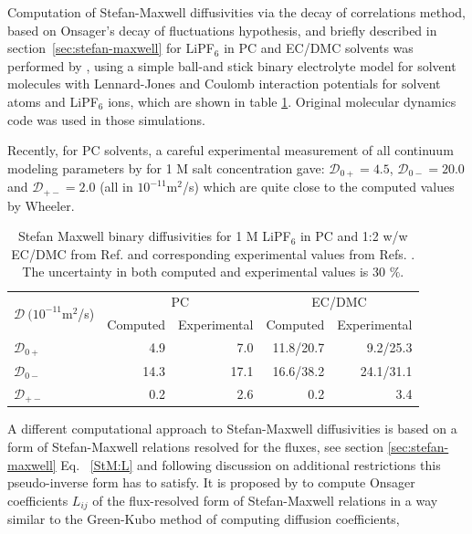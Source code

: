 \documentclass[../main.tex]{subfiles}
\begin{document}
Computation of Stefan-Maxwell diffusivities via the decay of correlations method, based on Onsager's decay of fluctuations hypothesis, and briefly described in section~\ref{sec:stefan-maxwell} for LiPF$_6$ in PC and EC/DMC solvents was performed by \citeauthor{2002PhDWheeler}, using a simple ball-and stick binary electrolyte model for solvent molecules with Lennard-Jones and Coulomb interaction potentials for solvent atoms and LiPF$_6$ ions, \cite{2002PhDWheeler} which are shown in table \ref{tab:wheeler}. Original molecular dynamics code was used in those simulations.

Recently, for PC solvents, a careful experimental measurement of all continuum modeling parameters by \citeauthor{Hou2020} for 1 M salt concentration gave:\cite{Hou2020}
 $ \mathcal{D}_{0+}=  4.5$, $  \mathcal{D}_{0-}= 20.0 $  and $   \mathcal{D}_{+-}=  2.0$ (all in $    10^{-11}$m$^2$/s)
which are quite close to the computed values by Wheeler.\cite{2002PhDWheeler}
\begin{table}[htbp]
    \caption{Stefan Maxwell binary diffusivities for 1 M LiPF$_6$ in PC and 1:2 w/w EC/DMC from Ref.  and corresponding experimental values from Refs. . The uncertainty in both computed and experimental values is 30 $\%$.}
    \centering
    \begin{tabular}{|l|r|r|r|r|} \hline
        \multirow{2}{*}{$\mathcal{D}~(10^{-11}$m$^2$/s)} & \multicolumn{2}{|c|}{PC} & \multicolumn{2}{|c|}{EC/DMC} \\ \cline{2-5}
        & Computed & Experimental & Computed & Experimental \\ \hline
        $\mathcal{D}_{0+}$ & 4.9 & 7.0 & 11.8/20.7 & 9.2/25.3 \\ \hline
        $\mathcal{D}_{0-}$ & 14.3 & 17.1 & 16.6/38.2 & 24.1/31.1\\ \hline
        $\mathcal{D}_{+-}$ & 0.2 & 2.6 & 0.2 & 3.4\\ \hline
    \end{tabular}
    \label{tab:wheeler}
\end{table}

A different computational approach\cite{rosstaylor1993, Krishna2005,FongTransport2020,Mallarapu2021} to Stefan-Maxwell diffusivities is based on a form of Stefan-Maxwell relations resolved for the fluxes, see section \ref{sec:stefan-maxwell} Eq. ~\ref{StM:L} and following discussion on additional restrictions this pseudo-inverse form has to satisfy. It is proposed by \citeauthor{Krishna2005} to compute Onsager coefficients $L_{ij}$ of the flux-resolved form of Stefan-Maxwell relations in a way similar to the Green-Kubo method of computing diffusion coefficients,\cite{Krishna2005}
\end{document}
